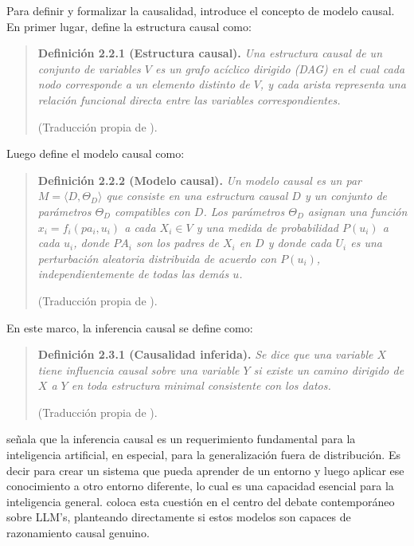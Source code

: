 \documentclass{article}
\begin{document}
Para definir y formalizar la causalidad, \textcite{pearl2009causality} introduce el concepto de modelo causal. 
En primer lugar, define la estructura causal como:

\begin{quote}
\textbf{Definición 2.2.1 (Estructura causal).}
\textit{Una estructura causal de un conjunto de variables $V$ es un grafo 
acíclico dirigido (DAG) en el cual cada nodo corresponde a un elemento distinto 
de $V$, y cada arista representa una relación funcional directa entre las 
variables correspondientes.}

\hfill\footnotesize{(Traducción propia de \textcite[p.~44]{pearl2009causality}).}
\end{quote}

Luego define el modelo causal como: 

\begin{quote}
\textbf{Definición 2.2.2 (Modelo causal).} 
\textit{Un modelo causal es un par $M = \langle D, \Theta_D \rangle$ que consiste en una estructura 
causal $D$ y un conjunto de parámetros $\Theta_D$ compatibles con $D$. Los parámetros $\Theta_D$ asignan una 
función $x_i = f_i(pa_i, u_i)$ a cada $X_i \in V$ y una medida de probabilidad $P(u_i)$ a cada $u_i$, donde $PA_i$ 
son los padres de $X_i$ en $D$ y donde cada $U_i$ es una perturbación aleatoria distribuida de acuerdo con $P(u_i)$, 
independientemente de todas las demás $u$.}

\hfill\footnotesize{(Traducción propia de \textcite[p.~44]{pearl2009causality}).}
\end{quote}

En este marco, la inferencia causal se define como: 

\begin{quote}
\textbf{Definición 2.3.1 (Causalidad inferida).}
\textit{Se dice que una variable $X$ tiene influencia causal sobre una variable $Y$ si existe un camino dirigido de $X$ a $Y$ en toda estructura minimal consistente con los datos.}

\hfill\footnotesize{(Traducción propia de \textcite[p.~45]{pearl2009causality}).}
\end{quote}
\textcite{scholkopf2021toward} señala que la inferencia causal es un requerimiento fundamental para la inteligencia artificial, en especial, 
para la generalización fuera de distribución. Es decir para crear un sistema que pueda aprender de un entorno y luego aplicar ese conocimiento 
a otro entorno diferente, lo cual es una capacidad esencial para la inteligencia general. \textcite{jin2023cladder} coloca esta cuestión
en el centro del debate contemporáneo sobre LLM's, planteando directamente 
si estos modelos son capaces de razonamiento causal genuino.
\end{document}
